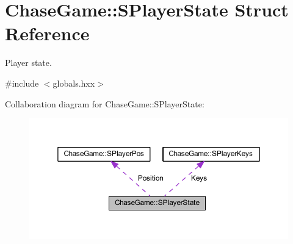 \hypertarget{struct_chase_game_1_1_s_player_state}{\section{Chase\-Game\-:\-:S\-Player\-State Struct Reference}
\label{struct_chase_game_1_1_s_player_state}
}


Player state.  




{\ttfamily \#include $<$globals.\-hxx$>$}



Collaboration diagram for Chase\-Game\-:\-:S\-Player\-State\-:\nopagebreak
\begin{figure}[H]
\begin{center}
\leavevmode
\includegraphics[width=350pt]{struct_chase_game_1_1_s_player_state__coll__graph}
\end{center}
\end{figure}
